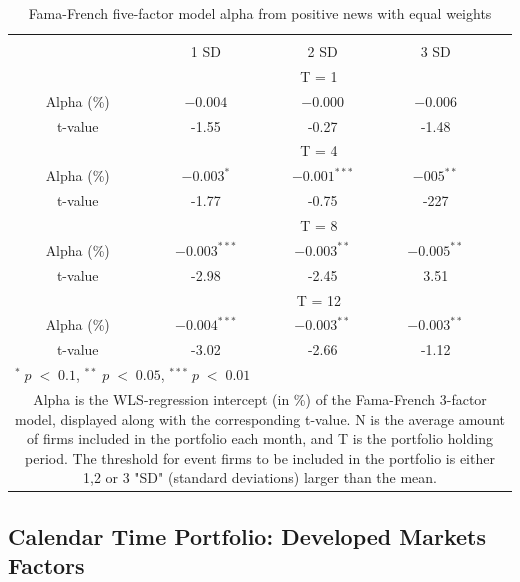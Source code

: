 \setlength{\tabcolsep}{15pt}
\begin{table}[]
\small
\centering
\caption{Fama-French five-factor model alpha from positive news with equal weights} 
\begin{tabular}{ccccccc}
\hline \hline \\ 
 &     &  &    1 SD  &  2 SD  &  3 SD  &  \\ \cline{4-6} 
& & & \multicolumn{3}{c}{ T = 1} & \\ \cline{2-6}
& Alpha (\%)  &  & $ -0.004$  & $-0.000$  & $-0.006$ &  \\
& t-value &  & -1.55 & -0.27  & -1.48 & \\
& & & \multicolumn{3}{c}{ T = 4} & \\ \cline{2-6}
& Alpha (\%)  &  & $ -0.003^{*}$  & $-0.001^{***}$  &  $-005^{**}$ & \\
& t-value & & -1.77  & -0.75 & -227 & \\
& & & \multicolumn{3}{c}{ T = 8} & \\ \cline{2-6}
& Alpha (\%)  &  & $ -0.003^{***}$   & $-0.003^{**}$  & $-0.005^{**}$ &  \\
& t-value &  & -2.98  & -2.45 & 3.51 & \\
&  & & \multicolumn{3}{c}{ T = 12} & \\ \cline{2-6}
& Alpha (\%)  &  & $ -0.004^{***}$  & $-0.003^{**}$  & $-0.003^{**}$ &  \\
& t-value &  & -3.02  & -2.66 & -1.12 & \\
\hline \hline
 \multicolumn{7}{l}{ \footnotesize $^* \; p\; <\; 0.1$, $ ^{**} \; p\; <\; 0.05$, $ ^{***} \; p\; <\; 0.01$  } \\
 \multicolumn{7}{p{11.5cm}}{ \footnotesize Alpha is the WLS-regression intercept (in \%) of the Fama-French 3-factor model, displayed along with the corresponding t-value. N is the average amount of firms included in the portfolio each month, and T is the portfolio holding period. The threshold for event firms to be included in the portfolio is either 1,2 or 3 "SD" (standard deviations) larger than the mean.}  \\ 
\end{tabular}
\label{tab: FF3-pos}
\end{table}



\subsection{Calendar Time Portfolio: Developed Markets Factors}

